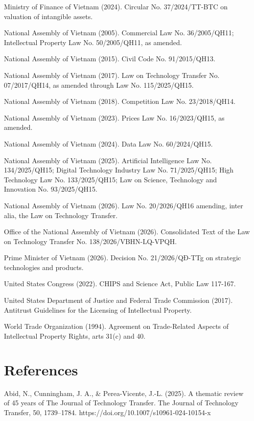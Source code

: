 \documentclass[
]{article}
\begin{document}
Ministry of Finance of Vietnam (2024). Circular No. 37/2024/TT-BTC on
valuation of intangible assets.

National Assembly of Vietnam (2005). Commercial Law No. 36/2005/QH11;
Intellectual Property Law No. 50/2005/QH11, as amended.

National Assembly of Vietnam (2015). Civil Code No. 91/2015/QH13.

National Assembly of Vietnam (2017). Law on Technology Transfer No.
07/2017/QH14, as amended through Law No. 115/2025/QH15.

National Assembly of Vietnam (2018). Competition Law No. 23/2018/QH14.

National Assembly of Vietnam (2023). Prices Law No. 16/2023/QH15, as
amended.

National Assembly of Vietnam (2024). Data Law No. 60/2024/QH15.

National Assembly of Vietnam (2025). Artificial Intelligence Law No.
134/2025/QH15; Digital Technology Industry Law No. 71/2025/QH15; High
Technology Law No. 133/2025/QH15; Law on Science, Technology and
Innovation No. 93/2025/QH15.

National Assembly of Vietnam (2026). Law No. 20/2026/QH16 amending,
inter alia, the Law on Technology Transfer.

Office of the National Assembly of Vietnam (2026). Consolidated Text of
the Law on Technology Transfer No. 138/2026/VBHN-LQ-VPQH.

Prime Minister of Vietnam (2026). Decision No. 21/2026/QĐ-TTg on
strategic technologies and products.

United States Congress (2022). CHIPS and Science Act, Public Law
117-167.

United States Department of Justice and Federal Trade Commission (2017).
Antitrust Guidelines for the Licensing of Intellectual Property.

World Trade Organization (1994). Agreement on Trade-Related Aspects of
Intellectual Property Rights, arts 31(c) and 40.

\section{References}\label{references}

Abid, N., Cunningham, J. A., \& Perea-Vicente, J.-L. (2025). A thematic
review of 45 years of The Journal of Technology Transfer. The Journal of
Technology Transfer, 50, 1739--1784.
https://doi.org/10.1007/s10961-024-10154-x
\end{document}
